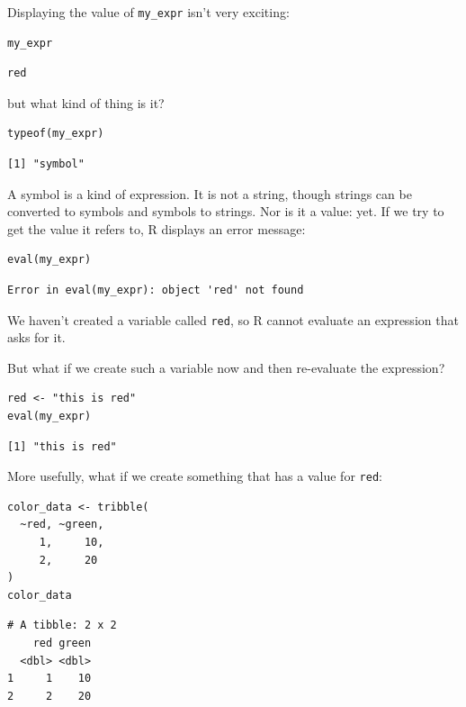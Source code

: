 \noindent
Displaying the value of \texttt{my\_expr} isn't very exciting:

\begin{lstlisting}
my_expr
\end{lstlisting}

\begin{lstlisting}
red
\end{lstlisting}

\noindent
but what kind of thing is it?

\begin{lstlisting}
typeof(my_expr)
\end{lstlisting}

\begin{lstlisting}
[1] "symbol"
\end{lstlisting}

A symbol is a kind of expression.
It is not a string,
though strings can be converted to symbols and symbols to strings.
Nor is it a value: yet.
If we try to get the value it refers to, R displays an error message:

\begin{lstlisting}
eval(my_expr)
\end{lstlisting}

\begin{lstlisting}
Error in eval(my_expr): object 'red' not found
\end{lstlisting}

\noindent
We haven't created a variable called \texttt{red},
so R cannot evaluate an expression that asks for it.

But what if we create such a variable now and then re-evaluate the expression?

\begin{lstlisting}
red <- "this is red"
eval(my_expr)
\end{lstlisting}

\begin{lstlisting}
[1] "this is red"
\end{lstlisting}

\noindent
More usefully,
what if we create something that has a value for \texttt{red}:

\begin{lstlisting}
color_data <- tribble(
  ~red, ~green,
     1,     10,
     2,     20
)
color_data
\end{lstlisting}

\begin{lstlisting}
# A tibble: 2 x 2
    red green
  <dbl> <dbl>
1     1    10
2     2    20
\end{lstlisting}

